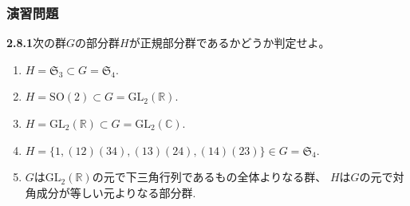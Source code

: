 \subsubsection*{演習問題}
\textbf{2.8.1}\quad 次の群$G$の部分群$H$が正規部分群であるかどうか判定せよ。
\begin{enumerate}[label=(\arabic*)\;]	
	\item $H=\mathfrak{S}_3 \subset G=\mathfrak{S}_4$.
	\item $H=\mathrm{SO}(2) \subset G=\mathrm{GL}_2(\mathbb{R})$.
	\item $H=\mathrm{GL}_2(\mathbb{R}) \subset G=\mathrm{GL}_2(\mathbb{C})$.
	\item $H=\{1,(12)(34),(13)(24),(14)(23)\} \in G=\mathfrak{S}_4$.
	\item $G$は$\mathrm{GL}_2(\mathbb{R})$の元で下三角行列であるもの全体よりなる群、
			$H$は$G$の元で対角成分が等しい元よりなる部分群.
\end{enumerate}
\par
